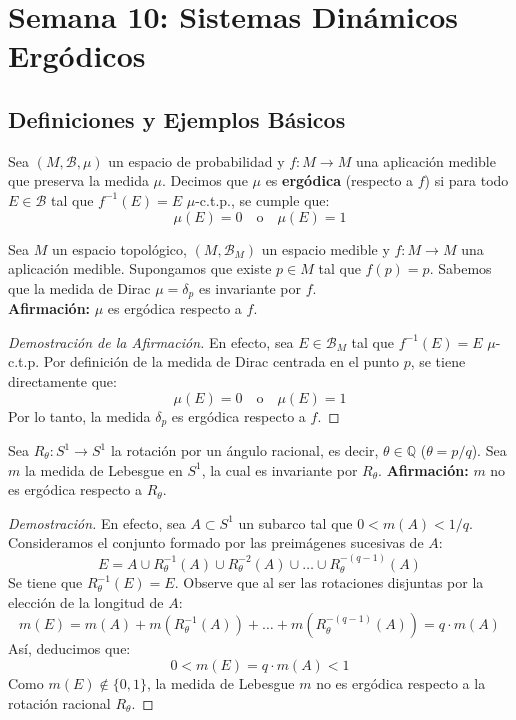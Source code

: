
\chapter{Semana 10: Sistemas Dinámicos Ergódicos}

\section{Definiciones y Ejemplos Básicos}

\begin{definicion}
	Sea $(M, \mathcal{B}, \mu)$ un espacio de probabilidad y $f: M \to M$ una aplicación medible que preserva la medida $\mu$. Decimos que $\mu$ es \textbf{ergódica} (respecto a $f$) si para todo $E \in \mathcal{B}$ tal que $f^{-1}(E) = E$ $\mu$-c.t.p., se cumple que:
	$$ \mu(E) = 0 \quad \text{o} \quad \mu(E) = 1 $$
\end{definicion}

\begin{observacion}
	Sea $M$ un espacio topológico, $(M, \mathcal{B}_M)$ un espacio medible y $f: M \to M$ una aplicación medible. Supongamos que existe $p \in M$ tal que $f(p) = p$. Sabemos que la medida de Dirac $\mu = \delta_p$ es invariante por $f$.\\	
	\textbf{Afirmación:} $\mu$ es ergódica respecto a $f$.
\end{observacion}
\begin{proof}[Demostración de la Afirmación]
	En efecto, sea $E \in \mathcal{B}_M$ tal que $f^{-1}(E) = E$ $\mu$-c.t.p. Por definición de la medida de Dirac centrada en el punto $p$, se tiene directamente que:
	$$ \mu(E) = 0 \quad \text{o} \quad \mu(E) = 1 $$
	Por lo tanto, la medida $\delta_p$ es ergódica respecto a $f$.
\end{proof}

\begin{ejemplo}
	Sea $R_\theta: S^1 \to S^1$ la rotación por un ángulo racional, es decir, $\theta \in \mathbb{Q}$ ($\theta = p/q$). Sea $m$ la medida de Lebesgue en $S^1$, la cual es invariante por $R_\theta$.
	\textbf{Afirmación:} $m$ no es ergódica respecto a $R_\theta$.
\end{ejemplo}
\begin{proof}[Demostración]
	En efecto, sea $A \subset S^1$ un subarco tal que $0 < m(A) < 1/q$. Consideramos el conjunto formado por las preimágenes sucesivas de $A$:
	$$ E = A \cup R_\theta^{-1}(A) \cup R_\theta^{-2}(A) \cup \dots \cup R_\theta^{-(q-1)}(A) $$
	Se tiene que $R_\theta^{-1}(E) = E$. Observe que al ser las rotaciones disjuntas por la elección de la longitud de $A$:
	$$ m(E) = m(A) + m(R_\theta^{-1}(A)) + \dots + m(R_\theta^{-(q-1)}(A)) = q \cdot m(A) $$
	Así, deducimos que:
	$$ 0 < m(E) = q \cdot m(A) < 1 $$
	Como $m(E) \notin \{0, 1\}$, la medida de Lebesgue $m$ no es ergódica respecto a la rotación racional $R_\theta$.
\end{proof}

